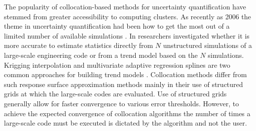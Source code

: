 The popularity of collocation-based methods for uncertainty quantification have stemmed from greater accessibility to computing clusters. As recently as 2006 the theme in uncertainty quantification had been how to get the most out of a limited number of available simulations \cite{Giunta}. In \cite{Giunta} researchers investigated whether it is more accurate to estimate statistics directly from $N$ unstructured simulations of a large-scale engineering code or from a trend model based on the $N$ simulations. Krigging interpolation and multivariate adaptive regression splines are two common approaches for building trend models \cite{Swiler}. Collocation methods differ from such response surface approximation methods mainly in their use of structured grids at which the large-scale codes are evaluated. Use of structured grids generally allow for faster convergence to various error thresholds. However, to achieve the expected convergence of collocation algorithms the number of times a large-scale code must be executed is dictated by the algorithm and not the user.  